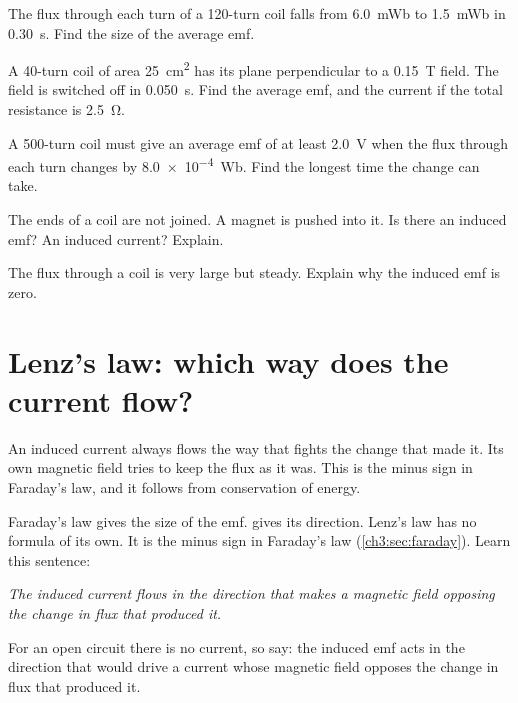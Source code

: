 \begin{quickcheck}
  \item The flux through each turn of a 120-turn coil falls from \qty{6.0}{mWb} to
        \qty{1.5}{mWb} in \qty{0.30}{s}. Find the size of the average emf.
  \item A 40-turn coil of area \qty{25}{cm^2} has its plane perpendicular to a
        \qty{0.15}{T} field. The field is switched off in \qty{0.050}{s}. Find the average emf,
        and the current if the total resistance is \qty{2.5}{\ohm}.
  \item A 500-turn coil must give an average emf of at least \qty{2.0}{V} when the
        flux through each turn changes by \qty{8.0e-4}{Wb}. Find the longest time
        the change can take.
  \item The ends of a coil are not joined. A magnet is pushed into it. Is there an
        induced emf? An induced current? Explain.
  \item The flux through a coil is very large but steady. Explain why the induced
        emf is zero.
\end{quickcheck}

\section{Lenz's law: which way does the current flow?}\label{ch3:sec:lenz}

\begin{bigidea}
An induced current always flows the way that fights the change that made it.
Its own magnetic field tries to keep the flux as it was. This is the minus sign
in Faraday's law, and it follows from conservation of energy.
\end{bigidea}

\begin{keywords}
\end{keywords}

Faraday's law gives the size of the emf.  gives its direction.
Lenz's law has no formula of its own. It is the minus sign in Faraday's law
(\cref{ch3:sec:faraday}). Learn this sentence:
\begin{center}
  \begin{minipage}{0.9\linewidth}\itshape
  The induced current flows in the direction that makes a magnetic field
  opposing the change in flux that produced it.
  \end{minipage}
\end{center}
For an open circuit there is no current, so say: the induced emf acts in the
direction that would drive a current whose magnetic field opposes the change in
flux that produced it.

